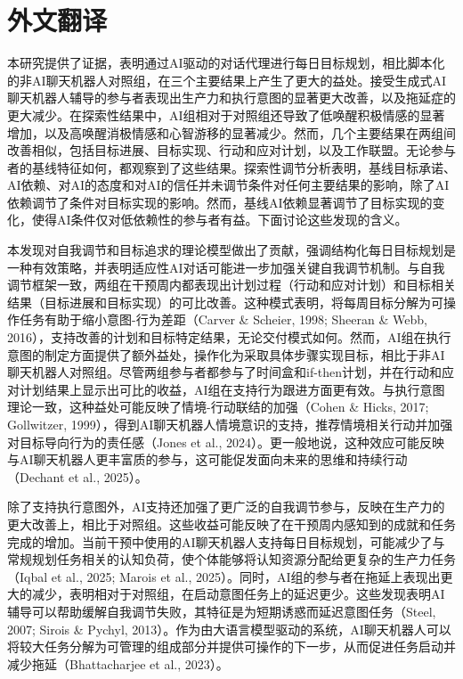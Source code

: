 \cleardoublepage

\newrefsection

\chapter{外文翻译}


\par 本研究提供了证据，表明通过AI驱动的对话代理进行每日目标规划，相比脚本化的非AI聊天机器人对照组，在三个主要结果上产生了更大的益处。接受生成式AI聊天机器人辅导的参与者表现出生产力和执行意图的显著更大改善，以及拖延症的更大减少。在探索性结果中，AI组相对于对照组还导致了低唤醒积极情感的显著增加，以及高唤醒消极情感和心智游移的显著减少。然而，几个主要结果在两组间改善相似，包括目标进展、目标实现、行动和应对计划，以及工作联盟。无论参与者的基线特征如何，都观察到了这些结果。探索性调节分析表明，基线目标承诺、AI依赖、对AI的态度和对AI的信任并未调节条件对任何主要结果的影响，除了AI依赖调节了条件对目标实现的影响。然而，基线AI依赖显著调节了目标实现的变化，使得AI条件仅对低依赖性的参与者有益。下面讨论这些发现的含义。

\par 本发现对自我调节和目标追求的理论模型做出了贡献，强调结构化每日目标规划是一种有效策略，并表明适应性AI对话可能进一步加强关键自我调节机制。与自我调节框架一致，两组在干预周内都表现出计划过程（行动和应对计划）和目标相关结果（目标进展和目标实现）的可比改善。这种模式表明，将每周目标分解为可操作任务有助于缩小意图-行为差距（Carver \& Scheier, 1998; Sheeran \& Webb, 2016），支持改善的计划和目标特定结果，无论交付模式如何。然而，AI组在执行意图的制定方面提供了额外益处，操作化为采取具体步骤实现目标，相比于非AI聊天机器人对照组。尽管两组参与者都参与了时间盒和if-then计划，并在行动和应对计划结果上显示出可比的收益，AI组在支持行为跟进方面更有效。与执行意图理论一致，这种益处可能反映了情境-行动联结的加强（Cohen \& Hicks, 2017; Gollwitzer, 1999），得到AI聊天机器人情境意识的支持，推荐情境相关行动并加强对目标导向行为的责任感（Jones et al., 2024）。更一般地说，这种效应可能反映与AI聊天机器人更丰富质的参与，这可能促发面向未来的思维和持续行动（Dechant et al., 2025）。

\par 除了支持执行意图外，AI支持还加强了更广泛的自我调节参与，反映在生产力的更大改善上，相比于对照组。这些收益可能反映了在干预周内感知到的成就和任务完成的增加。当前干预中使用的AI聊天机器人支持每日目标规划，可能减少了与常规规划任务相关的认知负荷，使个体能够将认知资源分配给更复杂的生产力任务（Iqbal et al., 2025; Marois et al., 2025）。同时，AI组的参与者在拖延上表现出更大的减少，表明相对于对照组，在启动意图任务上的延迟更少。这些发现表明AI辅导可以帮助缓解自我调节失败，其特征是为短期诱惑而延迟意图任务（Steel, 2007; Sirois \& Pychyl, 2013）。作为由大语言模型驱动的系统，AI聊天机器人可以将较大任务分解为可管理的组成部分并提供可操作的下一步，从而促进任务启动并减少拖延（Bhattacharjee et al., 2023）。

